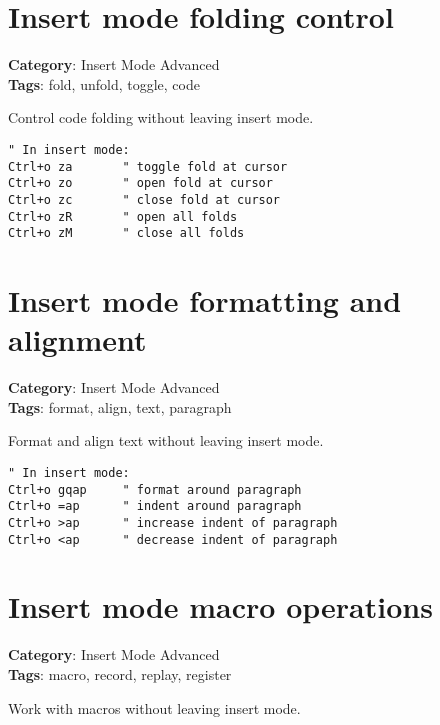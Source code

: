 {{{{{{\section{Insert mode folding control}

\textbf{Category}: Insert Mode Advanced\\ \textbf{Tags}: fold, unfold, toggle, code
\vspace{0.5cm}

Control code folding without leaving insert mode.

\begin{Exa*}{}
\begin{Verbatim}[fontsize=\footnotesize, breaklines, breakanywhere]
" In insert mode:
Ctrl+o za       " toggle fold at cursor
Ctrl+o zo       " open fold at cursor
Ctrl+o zc       " close fold at cursor
Ctrl+o zR       " open all folds
Ctrl+o zM       " close all folds
\end{Verbatim}
\end{Exa*}

\section{Insert mode formatting and alignment}

\textbf{Category}: Insert Mode Advanced\\ \textbf{Tags}: format, align, text, paragraph
\vspace{0.5cm}

Format and align text without leaving insert mode.

\begin{Exa*}{}
\begin{Verbatim}[fontsize=\footnotesize, breaklines, breakanywhere]
" In insert mode:
Ctrl+o gqap     " format around paragraph
Ctrl+o =ap      " indent around paragraph
Ctrl+o >ap      " increase indent of paragraph
Ctrl+o <ap      " decrease indent of paragraph
\end{Verbatim}
\end{Exa*}

\section{Insert mode macro operations}

\textbf{Category}: Insert Mode Advanced\\ \textbf{Tags}: macro, record, replay, register
\vspace{0.5cm}

Work with macros without leaving insert mode.

}}}}}}
